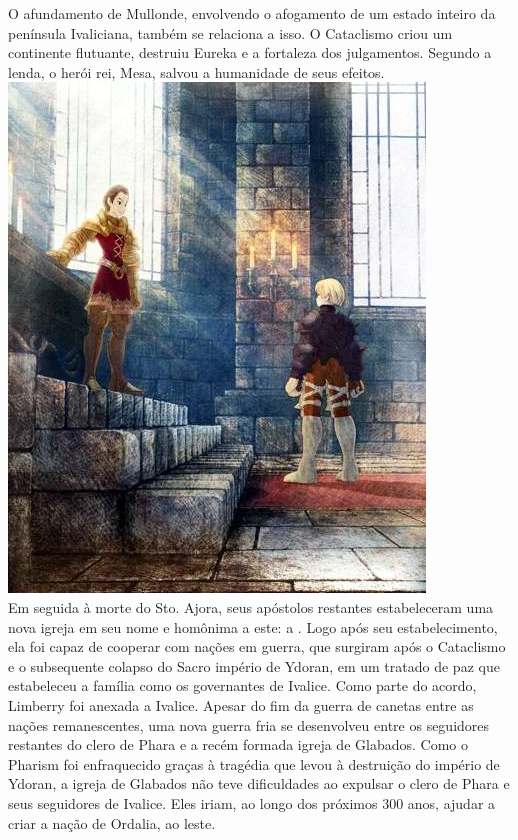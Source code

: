 O afundamento de Mullonde, envolvendo o afogamento de um estado inteiro da península Ivaliciana, também se relaciona a isso.
O Cataclismo criou um continente flutuante, destruiu Eureka e a fortaleza dos julgamentos.
Segundo a lenda, o herói rei, Mesa, salvou a humanidade de seus efeitos.
%
\ofpar
\includegraphics[width=\columnwidth]{./art/worldbook/delita.jpg}
\ofpar
%
\\
Em seguida à morte do Sto. Ajora, seus apóstolos restantes estabeleceram uma nova igreja em seu nome e homônima a este: a .
Logo após seu estabelecimento, ela foi capaz de cooperar com nações em guerra, que surgiram após o Cataclismo e o subsequente colapso do Sacro império de Ydoran, em um tratado de paz que estabeleceu a família  como os governantes de Ivalice.
Como parte do acordo, Limberry foi anexada a Ivalice.
Apesar do fim da guerra de canetas entre as nações remanescentes, uma nova guerra fria se desenvolveu entre os seguidores restantes do clero de Phara e a recém formada igreja de Glabados.
Como o Pharism foi enfraquecido graças à tragédia que levou à destruição do império de Ydoran, a igreja de Glabados não teve dificuldades ao expulsar o clero de Phara e seus seguidores de Ivalice. Eles iriam, ao longo dos próximos 300 anos, ajudar a criar a nação de Ordalia, ao leste.
